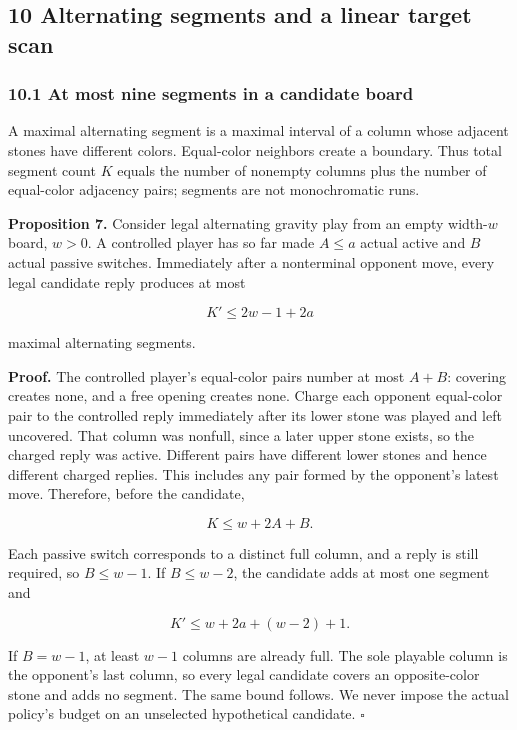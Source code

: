 \documentclass[
  a4paper,
]{article}
\newcounter{none} %
\begin{document}
\subsection{10 Alternating segments and a linear target
scan}\label{alternating-segments-and-a-linear-target-scan}

\subsubsection{10.1 At most nine segments in a candidate
board}\label{at-most-nine-segments-in-a-candidate-board}

A maximal alternating segment is a maximal interval of a column whose
adjacent stones have different colors. Equal-color neighbors create a
boundary. Thus total segment count \(K\) equals the number of nonempty
columns plus the number of equal-color adjacency pairs; segments are not
monochromatic runs.

\textbf{Proposition 7.} Consider legal alternating gravity play from an
empty width-\(w\) board, \(w>0\). A controlled player has so far made
\(A\le a\) actual active and \(B\) actual passive switches. Immediately
after a nonterminal opponent move, every legal candidate reply produces
at most

\[K'\le2w-1+2a\]

maximal alternating segments.

\textbf{Proof.} The controlled player's equal-color pairs number at most
\(A+B\): covering creates none, and a free opening creates none. Charge
each opponent equal-color pair to the controlled reply immediately after
its lower stone was played and left uncovered. That column was nonfull,
since a later upper stone exists, so the charged reply was active.
Different pairs have different lower stones and hence different charged
replies. This includes any pair formed by the opponent's latest move.
Therefore, before the candidate,

\[K\le w+2A+B.\]

Each passive switch corresponds to a distinct full column, and a reply
is still required, so \(B\le w-1\). If \(B\le w-2\), the candidate adds
at most one segment and

\[K'\le w+2a+(w-2)+1.\]

If \(B=w-1\), at least \(w-1\) columns are already full. The sole
playable column is the opponent's last column, so every legal candidate
covers an opposite-color stone and adds no segment. The same bound
follows. We never impose the actual policy's budget on an unselected
hypothetical candidate. \(\square\)
\end{document}

